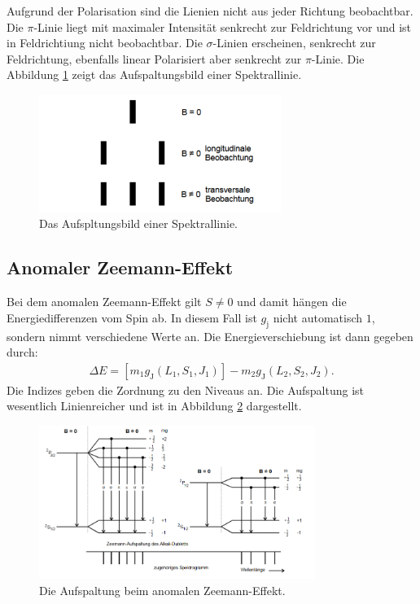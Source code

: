 Aufgrund der Polarisation sind die Lienien nicht aus jeder Richtung beobachtbar.
Die $\pi$-Linie liegt mit maximaler Intensität senkrecht zur Feldrichtung vor und ist in Feldrichtiung nicht beobachtbar.
Die $\sigma$-Linien erscheinen, senkrecht zur Feldrichtung, ebenfalls linear Polarisiert aber senkrecht zur $\pi$-Linie.
Die Abbildung \ref{fig:aufspaltungsbild} zeigt das Aufspaltungsbild einer Spektrallinie.
\begin{figure}
   \centering
    \includegraphics[width=0.7\textwidth]{aufspaltungsbild.PNG}
    \caption{Das Aufspltungsbild einer Spektrallinie.\cite{skript}}
    \label{fig:aufspaltungsbild}
\end{figure}
\subsection{Anomaler Zeemann-Effekt}
Bei dem anomalen Zeemann-Effekt gilt $S \neq 0$ und damit hängen die Energiedifferenzen vom Spin ab.
In diesem Fall ist $g_\mathrm{j}$ nicht automatisch $1$, sondern nimmt verschiedene Werte an.
Die Energieverschiebung ist dann gegeben durch:
\begin{align}
  \Delta E= [m_\mathrm{1}g_\mathrm{J}(L_\mathrm{1},S_\mathrm{1},J_\mathrm{1})]-m_\mathrm{2}g_\mathrm{J}(L_\mathrm{2},S_\mathrm{2},J_\mathrm{2}).
\end{align}
Die Indizes geben die Zordnung zu den Niveaus an.
Die Aufspaltung ist wesentlich Linienreicher und ist in Abbildung \ref{fig:anomal} dargestellt.
\begin{figure}
   \centering
    \includegraphics[width=0.8\textwidth]{anomal.PNG}
    \caption{Die Aufspaltung beim anomalen Zeemann-Effekt.\cite{skript}}
    \label{fig:anomal}
\end{figure}
